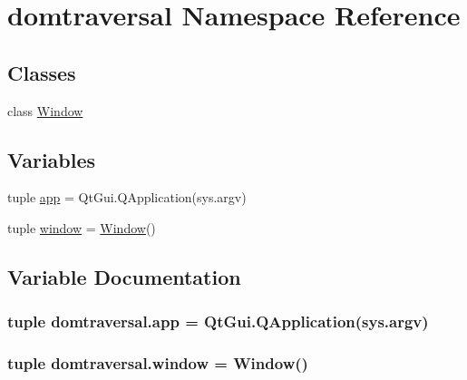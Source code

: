 \hypertarget{namespacedomtraversal}{}\section{domtraversal Namespace Reference}
\label{namespacedomtraversal}
\subsection*{Classes}
\begin{DoxyCompactItemize}
\item 
class \hyperlink{classdomtraversal_1_1Window}{Window}
\end{DoxyCompactItemize}
\subsection*{Variables}
\begin{DoxyCompactItemize}
\item 
tuple \hyperlink{namespacedomtraversal_afd74e13adc89212364e3c2f8e6d5476f}{app} = Qt\+Gui.\+Q\+Application(sys.\+argv)
\item 
tuple \hyperlink{namespacedomtraversal_a37702f39882c03232a20ad99bd0e4da5}{window} = \hyperlink{classdomtraversal_1_1Window}{Window}()
\end{DoxyCompactItemize}


\subsection{Variable Documentation}
\hypertarget{namespacedomtraversal_afd74e13adc89212364e3c2f8e6d5476f}{}
\subsubsection[{app}]{\setlength{\rightskip}{0pt plus 5cm}tuple domtraversal.\+app = Qt\+Gui.\+Q\+Application(sys.\+argv)}\label{namespacedomtraversal_afd74e13adc89212364e3c2f8e6d5476f}
\hypertarget{namespacedomtraversal_a37702f39882c03232a20ad99bd0e4da5}{}
\subsubsection[{window}]{\setlength{\rightskip}{0pt plus 5cm}tuple domtraversal.\+window = {\bf Window}()}\label{namespacedomtraversal_a37702f39882c03232a20ad99bd0e4da5}
